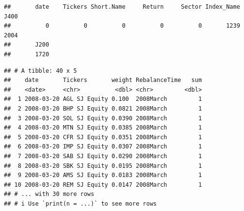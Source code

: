 \documentclass[11pt,preprint, authoryear]{elsarticle}
\numberwithin{equation}{section}
\numberwithin{figure}{section}
\numberwithin{table}{section}
\begin{document}
\begin{verbatim}
##       date    Tickers Short.Name     Return     Sector Index_Name       J400 
##          0          0          0          0          0       1239       2004 
##       J200 
##       1720
\end{verbatim}

\begin{verbatim}
## # A tibble: 40 x 5
##    date       Tickers       weight RebalanceTime   sum
##    <date>     <chr>          <dbl> <chr>         <dbl>
##  1 2008-03-20 AGL SJ Equity 0.100  2008March         1
##  2 2008-03-20 BHP SJ Equity 0.0821 2008March         1
##  3 2008-03-20 SOL SJ Equity 0.0390 2008March         1
##  4 2008-03-20 MTN SJ Equity 0.0385 2008March         1
##  5 2008-03-20 CFR SJ Equity 0.0351 2008March         1
##  6 2008-03-20 IMP SJ Equity 0.0307 2008March         1
##  7 2008-03-20 SAB SJ Equity 0.0290 2008March         1
##  8 2008-03-20 SBK SJ Equity 0.0195 2008March         1
##  9 2008-03-20 AMS SJ Equity 0.0183 2008March         1
## 10 2008-03-20 REM SJ Equity 0.0147 2008March         1
## # ... with 30 more rows
## # i Use `print(n = ...)` to see more rows
\end{verbatim}


\end{document}
